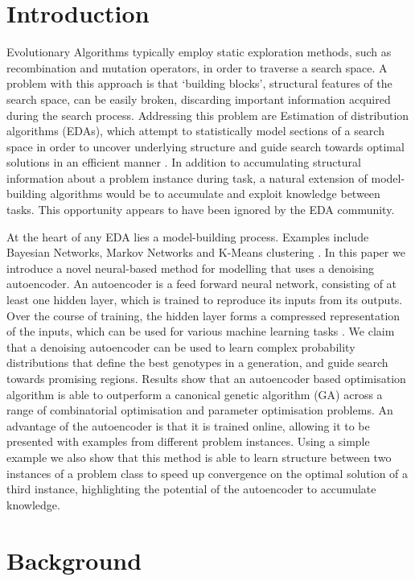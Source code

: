 \documentclass[runningheads,a4paper]{llncs}
\begin{document}
\section{Introduction}
Evolutionary Algorithms typically employ static exploration methods, such as recombination and mutation operators, in order to traverse a search space. A problem with this approach is that `building blocks', structural features of the search space, can be easily broken, discarding important information acquired during the search process. Addressing this problem are Estimation of distribution algorithms (EDAs), which attempt to statistically model sections of a search space in order to uncover underlying structure and guide search towards optimal solutions in an efficient manner \cite{pelikan2006scalable}. In addition to accumulating structural information about a problem instance during task, a natural extension of model-building algorithms would be to accumulate and exploit knowledge between tasks. This opportunity appears to have been ignored by the EDA community.

At the heart of any EDA lies a model-building process. Examples include Bayesian Networks, Markov Networks and K-Means clustering \cite{pelikan2002survey}. In this paper we introduce a novel neural-based method for modelling that uses a denoising autoencoder. An autoencoder is a feed forward neural network, consisting of at least one hidden layer, which is trained to reproduce its inputs from its outputs. Over the course of training, the hidden layer forms a compressed representation of the inputs, which can be used for various machine learning tasks \cite{hinton2006reducing}. We claim that a denoising autoencoder can be used to learn complex probability distributions that define the best genotypes in a generation, and guide search towards promising regions. Results show that an autoencoder based optimisation algorithm is able to outperform a canonical genetic algorithm (GA) across a range of combinatorial optimisation and parameter optimisation problems. An advantage of the autoencoder is that it is trained online, allowing it to be presented with examples from different problem instances. Using a simple example we also show that this method is able to learn structure between two instances of a problem class to speed up convergence on the optimal solution of a third instance, highlighting the potential of the autoencoder to accumulate knowledge.

\section{Background}
\end{document}
